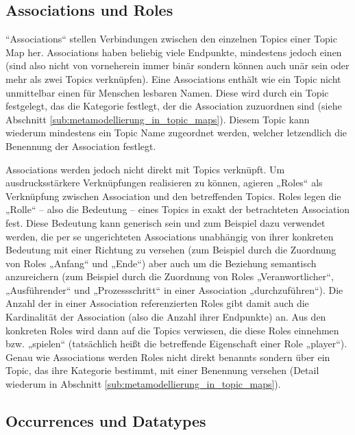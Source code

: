 
\subsection{Associations und Roles} %
\label{sub:associations_und_roles}

“Associations“ stellen Verbindungen zwischen den einzelnen Topics einer Topic Map her. Associations haben beliebig viele Endpunkte, mindestens jedoch einen (sind also nicht von vorneherein immer binär sondern können auch unär sein oder mehr als zwei Topics verknüpfen). Eine Associations enthält wie ein Topic nicht unmittelbar einen für Menschen lesbaren Namen. Diese wird durch ein Topic festgelegt, das die Kategorie festlegt, der die Association zuzuordnen sind (siehe Abschnitt \ref{sub:metamodellierung_in_topic_maps}). Diesem Topic kann wiederum mindestens ein Topic Name zugeordnet werden, welcher letzendlich die Benennung der Association festlegt.

Associations werden jedoch nicht direkt mit Topics verknüpft. Um ausdrucksstärkere Verknüpfungen realisieren zu können, agieren „Roles“ als Verknüpfung zwischen Association und den betreffenden Topics. Roles legen die „Rolle“ -- also die Bedeutung -- eines Topics in exakt der betrachteten Association fest. Diese Bedeutung kann generisch sein und zum Beispiel dazu verwendet werden, die per se ungerichteten Associations unabhängig von ihrer konkreten Bedeutung mit einer Richtung zu versehen (zum Beispiel durch die Zuordnung von Roles „Anfang“ und „Ende“) aber auch um die Beziehung semantisch anzureichern (zum Beispiel durch die Zuordnung von Roles „Veranwortlicher“, „Ausführender“ und „Prozessschritt“ in einer Association „durchzuführen“). Die Anzahl der in einer Association referenzierten Roles gibt damit auch die Kardinalität der Association (also die Anzahl ihrer Endpunkte) an. Aus den konkreten Roles wird dann auf die Topics verwiesen, die diese Roles einnehmen bzw. „spielen“ (tatsächlich heißt die betreffende Eigenschaft einer Role „player“). Genau wie Associations werden Roles nicht direkt benannts sondern über ein Topic, das ihre Kategorie bestimmt, mit einer Benennung versehen (Detail wiederum in Abschnitt \ref{sub:metamodellierung_in_topic_maps}).


\subsection{Occurrences und Datatypes} %
\label{sub:occurrences_und_datatypes}

